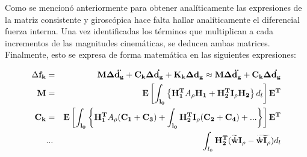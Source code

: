 Como se mencionó anteriormente para obtener analíticamente las expresiones de la matriz consistente y giroscópica hace falta hallar analíticamente el diferencial fuerza interna. Una vez identificadas los términos que multiplican a cada incrementos de las magnitudes cinemáticas, se deducen ambas matrices. Finalmente, esto se expresa de forma matemática en las siguientes expresiones:

\begin{eqnarray}
	\Delta \bf{f_k}&= &\bf{M} \Delta \ddot{\bf{d}_g}+\bf{C}_k \Delta \dot{\bf{d}_g}+\bf{K}_k \Delta \bf{d}_g\approx \bf{M} \Delta \ddot{\bf{d}_g}+\bf{C}_k \Delta \dot{\bf{d}_g}\\
	\label{Eqn:PRE:MatrizM}
	\bf{M}&=&\bf{E}\left [ \int _{l_0} \left \{ \bf{H}_1^T \text{$A_\rho$}\bf{H}_1 +\bf{H}_2^T\bf{I}_\rho\bf{H_2} \right \} \text{$d_l$} \right  ]\bf{E}^T\\
	\label{Eqn:PRE:MtarizC}
	\bf{C}_k&=&\bf{E}\left [ \int _{l_0} \left \{ \bf{H}_1^T \text{$A_\rho$}(\bf{C}_1+\bf{C}_3) +\int _{l_0}\bf{H}_2^T\bf{I}_\rho(\bf{C}_2+\bf{C}_4) +...\right \}\right  ]\bf{E}^T\\
	&...& \int_{l_0} \bf{H}_2 ^T(\widetilde{\dot{w}}\bf{I}_\rho-\widetilde{\dot{w}\bf{I}_\rho}) \text{$d_l$}
\end{eqnarray}

\newpage
